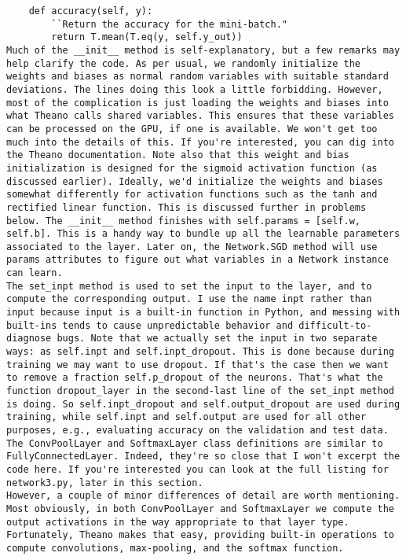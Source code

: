\begin{lstlisting}
    def accuracy(self, y):
        ``Return the accuracy for the mini-batch."
        return T.mean(T.eq(y, self.y_out))
Much of the __init__ method is self-explanatory, but a few remarks may help clarify the code. As per usual, we randomly initialize the weights and biases as normal random variables with suitable standard deviations. The lines doing this look a little forbidding. However, most of the complication is just loading the weights and biases into what Theano calls shared variables. This ensures that these variables can be processed on the GPU, if one is available. We won't get too much into the details of this. If you're interested, you can dig into the Theano documentation. Note also that this weight and bias initialization is designed for the sigmoid activation function (as discussed earlier). Ideally, we'd initialize the weights and biases somewhat differently for activation functions such as the tanh and rectified linear function. This is discussed further in problems below. The __init__ method finishes with self.params = [self.w, self.b]. This is a handy way to bundle up all the learnable parameters associated to the layer. Later on, the Network.SGD method will use params attributes to figure out what variables in a Network instance can learn.
The set_inpt method is used to set the input to the layer, and to compute the corresponding output. I use the name inpt rather than input because input is a built-in function in Python, and messing with built-ins tends to cause unpredictable behavior and difficult-to-diagnose bugs. Note that we actually set the input in two separate ways: as self.inpt and self.inpt_dropout. This is done because during training we may want to use dropout. If that's the case then we want to remove a fraction self.p_dropout of the neurons. That's what the function dropout_layer in the second-last line of the set_inpt method is doing. So self.inpt_dropout and self.output_dropout are used during training, while self.inpt and self.output are used for all other purposes, e.g., evaluating accuracy on the validation and test data.
The ConvPoolLayer and SoftmaxLayer class definitions are similar to FullyConnectedLayer. Indeed, they're so close that I won't excerpt the code here. If you're interested you can look at the full listing for network3.py, later in this section.
However, a couple of minor differences of detail are worth mentioning. Most obviously, in both ConvPoolLayer and SoftmaxLayer we compute the output activations in the way appropriate to that layer type. Fortunately, Theano makes that easy, providing built-in operations to compute convolutions, max-pooling, and the softmax function.

\end{lstlisting}
